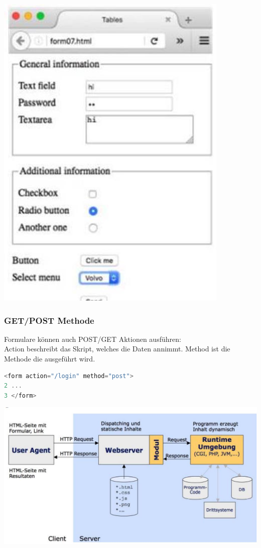 \begin{center}
\includegraphics[width=0.5\linewidth]{images/2024_12_29_858f09cde51177c71657g-29}
\end{center}

\subsubsection{GET/POST Methode}

Formulare können auch POST/GET Aktionen ausführen:\\
Action beschreibt das Skript, welches die Daten annimmt. Method ist die Methode die ausgeführt wird.

\begin{lstlisting}[language=JavaScript, style=basesmol]
<form action="/login" method="post">
2 ...
3 </form>
\end{lstlisting}

\begin{center}
\includegraphics[width=\linewidth]{images/2024_12_29_858f09cde51177c71657g-29(1)}
\end{center}

